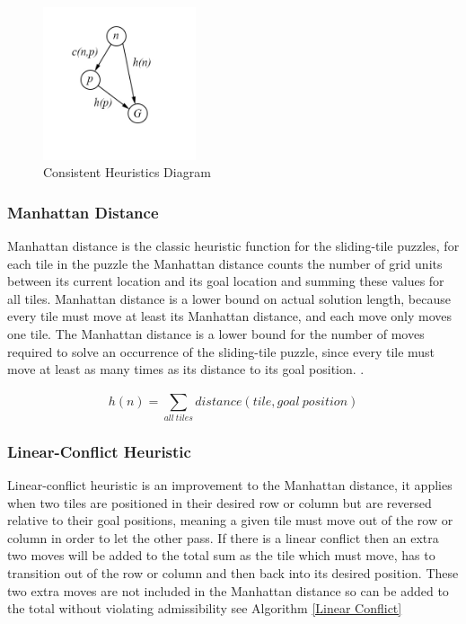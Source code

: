 \documentclass[final]{cmpreport}
\begin{document}
\begin{figure}[ht]
	\centering
	\includegraphics[width=0.4\textwidth]{consistent}
	\captionsetup{justification=centering}
	\caption{Consistent Heuristics Diagram}
\end{figure}



\subsubsection{Manhattan Distance}
Manhattan distance is the classic heuristic function for the sliding-tile puzzles, for each tile in the puzzle the Manhattan distance counts the number of grid units between its current location
and its goal location and summing these values for all tiles. Manhattan distance is a lower bound on actual solution length, because every tile must move at least its Manhattan distance, and each move only moves one tile. The Manhattan distance is a lower bound for the number of moves required to solve an occurrence of the sliding-tile puzzle, since every tile must move at least as many times as its distance to its goal position. \citep{DBLP:conf/ccgrid/LinnertSB14}. 

$$h(n)= \sum_{all\ tiles}^{}distance(tile, goal\ position)$$



	


\subsubsection{Linear-Conflict Heuristic}
Linear-conflict heuristic is an improvement to the Manhattan distance, it applies when two tiles are positioned in their desired row or column but are reversed relative to
their goal positions, meaning a given tile must move out of the row or column in order to let the other pass. If there is a linear conflict then an extra two moves will be added to the total sum as the tile which must move, has to transition out of the row or column and then back into its desired position. These two extra moves are not included in the Manhattan distance so can be added to the total without violating admissibility see Algorithm \ref{Linear Conflict} 
\end{document}
